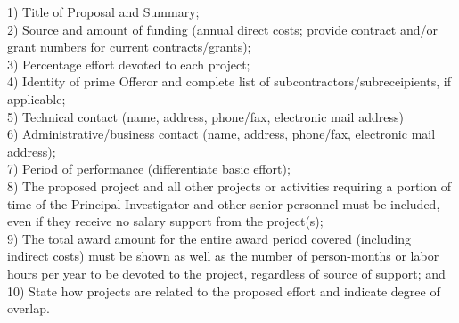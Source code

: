1) Title of Proposal and Summary;\\
2) Source and amount of funding (annual direct costs; provide contract and/or
grant numbers for current contracts/grants);\\
3) Percentage effort devoted to each project;\\
4) Identity of prime Offeror and complete list of subcontractors/subreceipients, if
applicable;\\
5) Technical contact (name, address, phone/fax, electronic mail address)\\
6) Administrative/business contact (name, address, phone/fax, electronic mail
address);\\
7) Period of performance (differentiate basic effort);\\
8) The proposed project and all other projects or activities requiring a portion of
time of the Principal Investigator and other senior personnel must be included,
even if they receive no salary support from the project(s);\\


9) The total award amount for the entire award period covered (including indirect
costs) must be shown as well as the number of person-months or labor hours per
year to be devoted to the project, regardless of source of support; and\\

10) State how projects are related to the proposed effort and indicate degree of
overlap. 